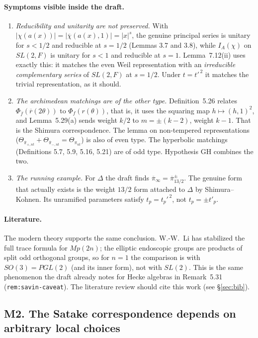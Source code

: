 \documentclass[12pt,letterpaper]{article}
\newcommand{\ov}[1]{\overline{#1}}
\theoremstyle{plain}
\begin{document}
\paragraph{Symptoms visible inside the draft.}
\begin{enumerate}
\item \emph{Reducibility and unitarity are not preserved.} With
$|\chi(a(x))|=|\ov\chi(a(x),1)|=|x|^s$, the genuine principal series is
unitary for $s<1/2$ and reducible at $s=1/2$ (Lemmas 3.7 and 3.8), while
$I_A(\chi)$ on $SL(2,F)$ is unitary for $s<1$ and reducible at $s=1$.
Lemma~7.12(ii) uses exactly this: it matches the even Weil representation
with an \emph{irreducible complementary series} of $SL(2,F)$ at $s=1/2$.
Under $t=t'^{\,2}$ it matches the trivial representation, as it should.
\item \emph{The archimedean matchings are of the other type.}
Definition~5.26 relates $\Phi_{\ov f}(\ov r(2\theta))$ to
$\Phi_f(r(\theta))$, that is, it uses the squaring map
$h\mapsto(h,1)^2$, and Lemma~5.29(a) sends weight $k/2$ to
$m=\pm(k-2)$, weight $k-1$. That is the Shimura correspondence. The lemma
on non-tempered representations
($\Theta_{\ov\pi_{+,nt}}+\Theta_{\ov\pi_{-,nt}}=\Theta_{\pi_{nt}}$) is
also of even type. The hyperbolic matchings (Definitions 5.7, 5.9, 5.16, 5.21)
are of odd type. Hypothesis GH combines the two.
\item \emph{The running example.} For $\Delta$ the draft finds
$\ov\pi_\infty=\ov\pi^{\pm}_{13/2}$. The genuine form that actually exists
is the weight $13/2$ form attached to $\Delta$ by Shimura--Kohnen. Its
unramified parameters satisfy $t_p=t_p'^{\,2}$, not $t_p=\pm t'_p$.
\end{enumerate}

\paragraph{Literature.} The modern theory supports the same conclusion.
W.-W.~Li has stabilized the full trace formula for $Mp(2n)$; the elliptic
endoscopic groups are products of split odd orthogonal groups, so for
$n=1$ the comparison is with $SO(3)=PGL(2)$ (and its inner form), not with
$SL(2)$. This is the same phenomenon the draft already notes for Hecke
algebras in Remark~5.31 (\texttt{rem:savin-caveat}). The literature review
should cite this work (see \S\ref{sec:bib}).

\subsection*{M2. The Satake correspondence depends on arbitrary local choices}
\end{document}
